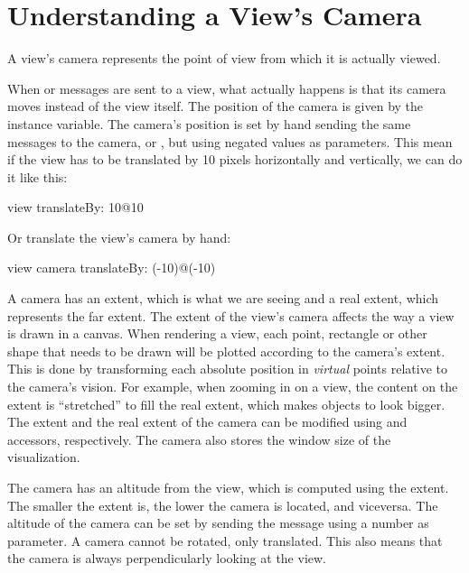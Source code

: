 \documentclass[a4paper,10pt,twoside]{book}
\begin{document}



\section{Understanding a View's Camera} 

A view's camera represents the point of view from which it is actually viewed. 

When  or  messages are sent to a view, what actually happens is that its camera moves instead of the view itself. The position of the camera is given by the  instance variable. The camera's position is set by hand sending the same messages to the camera,  or , but using negated values as parameters. This mean if the view has to be translated by 10 pixels horizontally and vertically, we can do it like this:

\begin{code}{}
view translateBy: 10@10
\end{code}

Or translate the view's camera by hand:

\begin{code}{}
view camera translateBy: (-10)@(-10)
\end{code}

A camera has an extent, which is what we are seeing and a real extent, which represents the far extent. 
The extent of the view's camera affects the way a view is drawn in a canvas. When rendering a view, each point, rectangle or other shape that needs to be drawn will be plotted according to the camera's extent. This is done by transforming each absolute position in \emph{virtual} points relative to the camera's vision.
For example, when zooming in on a view, the content on the extent is ``stretched'' to fill the real extent, which makes objects to look bigger.  
The extent and the real extent of the camera can be modified using  and  accessors, respectively. The camera also stores the window size of the visualization.

The camera has an altitude from the view, which is computed using the extent. The smaller the extent is, the lower the camera is located, and viceversa. The altitude of the camera can be set by sending the  message using a number as parameter.
A camera cannot be rotated, only translated. This also means that the camera is always perpendicularly looking at the view.
\end{document}
